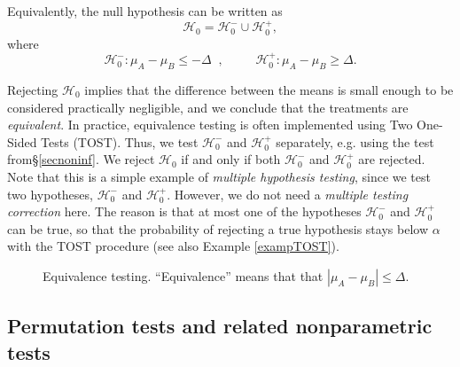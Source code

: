 \documentclass[11pt]{article}
\theoremstyle{plain}
\theoremstyle{definition}
\newcommand{\Hy}{\mathcal{H}}
\begin{document}
Equivalently, the null hypothesis can be written as 
$$\Hy_0 = \Hy_0^-\cup \Hy_0^+,$$
 where 
\[
\Hy_0^-: \mu_A - \mu_B \le -\Delta \;\;, \qquad \;\; \Hy_0^+: \mu_A - \mu_B \ge \Delta.
\]

Rejecting $\Hy_0$ implies that the difference between the means is small enough to be considered practically negligible, and we conclude that the treatments are \emph{equivalent}. In practice, equivalence testing is often implemented using Two One-Sided Tests (TOST). Thus, we test $\Hy_0^-$ and $\Hy_0^+$ separately, e.g. using the test from\S\ref{secnoninf}. We reject $\Hy_0$ if and only if both $\Hy_0^-$ and $\Hy_0^+$ are rejected. Note that this is a simple example of \emph{multiple hypothesis testing}, since we test two hypotheses, $\Hy_0^-$ and $\Hy_0^+$. However, we do not need a \emph{multiple testing correction} here. The reason is that at most one  of the hypotheses $\Hy_0^-$ and $\Hy_0^+$ can be true, so that the probability of rejecting a true hypothesis stays below $\alpha$ with the TOST procedure (see also Example \ref{exampTOST}).







\begin{figure}[h]
\centering
{}
\caption{Equivalence testing. ``Equivalence'' means that that $|\mu_A-\mu_B|\leq\Delta$.}
\label{fig:equivalence}
\end{figure}



\subsection{Permutation tests and related nonparametric tests}
\end{document}
